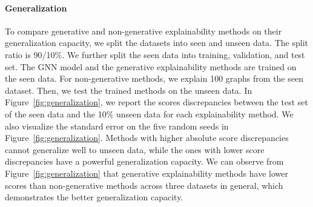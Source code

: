 \paragraph{Generalization} To compare generative and non-generative explainability methods on their generalization capacity, we split the datasets into seen and unseen data. The split ratio is 90/10$\%$. We further split the seen data into training, validation, and test set. The GNN model and the generative explainability methods are trained on the seen data. For non-generative methods, we explain 100 graphs from the seen dataset. Then, we test the trained methods on the unseen data. In Figure~\ref{fig:generalization}, we report the scores discrepancies between the test set of the seen data and the 10$\%$ unseen data for each explainability method. We also visualize the standard error on the five random seeds in Figure~\ref{fig:generalization}. Methods with higher absolute score discrepancies cannot generalize well to unseen data, while the ones with lower score discrepancies have a powerful generalization capacity. We can observe from Figure~\ref{fig:generalization} that generative explainability methods have lower scores than non-generative methods across three datasets in general, which demonstrates the better generalization capacity.







